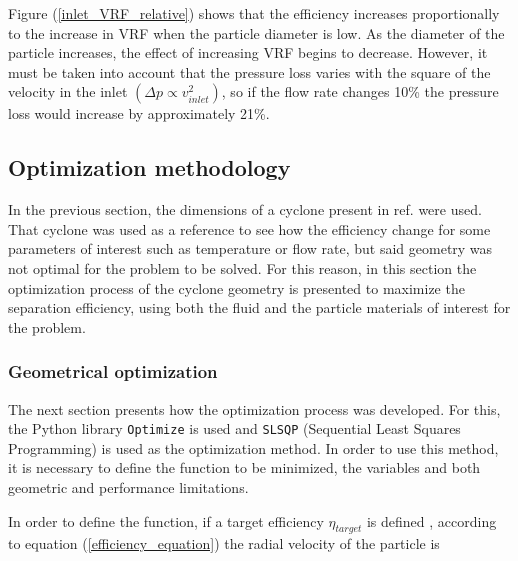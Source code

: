 Figure (\ref{inlet_VRF_relative}) shows  that the efficiency increases proportionally to the increase in VRF when the particle diameter is low. As the diameter of the particle increases, the effect of increasing VRF begins to decrease. However, it must be taken into account that the pressure loss varies with the square of the velocity in the inlet $\left(
\Delta p \propto v_{inlet} ^2 \right)$, so if the flow rate changes 10\% the pressure loss would increase by approximately 21\%.





\subsection{Optimization methodology}
In the previous section, the dimensions of a cyclone present in ref.\cite{Zhao2011} were used. That cyclone was used as a reference to see how the efficiency change for some parameters of interest such as temperature or flow rate, but said geometry was not optimal for the problem to be solved. For this reason, in this section the optimization process of the cyclone geometry is presented to maximize the separation efficiency, using both the fluid and the particle materials of interest for the problem.
\subsubsection{Geometrical optimization}

The next section presents how the optimization process was developed. For this, the Python library \texttt{Optimize} is used and \texttt{SLSQP} (Sequential Least Squares Programming) is used as the optimization method. In order to use this method, it is necessary to define the function to be minimized, the variables and both geometric and performance limitations.

In order to define the function, if a  target efficiency $\eta_{target}$ is defined , according to equation (\ref{efficiency_equation}) the radial velocity of the particle is

